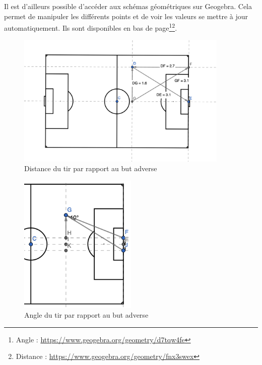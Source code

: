 \documentclass[12pt]{article}
\begin{document}
Il est d'ailleurs possible d'accéder aux schémas géométriques sur Geogebra.
Cela permet de manipuler les différents points et de voir les valeurs se mettre à jour automatiquement.
Ils sont disponibles en bas de page\footnote{Angle : \url{https://www.geogebra.org/geometry/d7tqw4fe}}\footnote{Distance : \url{https://www.geogebra.org/geometry/fnx3swex}}.

\begin{figure}[htp]
    \centering
    \includegraphics[width=0.9\textwidth]{img/schema_calcul_distance.png}
    \caption{Distance du tir par rapport au but adverse}
    \label{fig:distance_tir}
\end{figure}
\begin{figure}[htp]
    \centering
    \includegraphics[width=0.5\textwidth]{img/schema_calcul_angle.png}
    \caption{Angle du tir par rapport au but adverse}
    \label{fig:angle_tir}
\end{figure}
\end{document}
